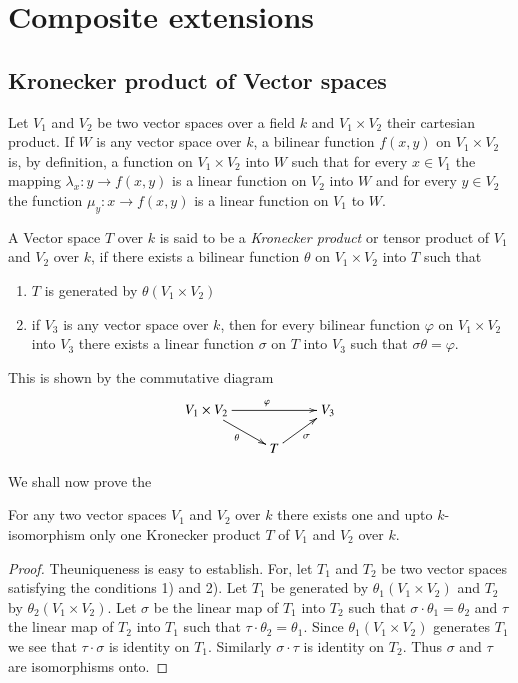 \chapter{Composite extensions}\label{chap5}%

\section{Kronecker product of Vector spaces}\label{c5:s1}\pageoriginale%

Let $V_1$ and $V_2$ be two vector spaces over a field $k$ and $V_1 \times
V_2$ their cartesian product. If $W$ is any vector space over $k$, a
bilinear function  $f(x,y)$ on $V_1 \times  V_2$ is, by definition, a
function on  $V_1 \times  V_2$  into $W$ such that for every $x \in V_1$ the
mapping $\lambda_x: y \to f(x,y)$ is a linear function on $V_2$ into
$W$ and for every $y \in V_2$ the function $\mu_y: x \to f(x,y)$ is a
linear function on $V_1$ to $W$. 

A Vector space $T$ over $k$ is said to be a \textit{Kronecker product}
or tensor product of $V_1$ and $V_2$ over $k$, if there exists a bilinear
function $\theta$ on  $V_1 \times  V_2$  into $T$ such that  
\begin{enumerate}[1)]
\item $T$ is generated by $\theta (V_1 \times  V_2)$ 

\item if $V_3$ is any vector space over $k$, then for every bilinear
  function $\varphi$ on  $V_1\times  V_2$  into $V_3$ there exists a
  linear function $\sigma$ on $T$ into $V_3$ such that $\sigma \theta =
  \varphi$. 
\end{enumerate}

This is shown by the commutative diagram
\[
\xymatrix@R=0.5cm{
V_1 \times V_2 \ar[rr]^{\varphi} \ar[dr]_{\theta} & & V_3\\
& T \ar[ur]_{\sigma}&
}
\]

We shall now prove the

\setcounter{thm}{0}
\begin{thm}\label{c5:thm1} %
For any two vector spaces $V_1$ and $V_2$ over $k$ there exists one
and upto $k$-isomorphism only one Kronecker product $T$ of $V_1$ and
$V_2$ over $k$. 
\end{thm}

\begin{proof}%
The\pageoriginale uniqueness is easy to establish. For, let $T_1$ and
$T_2$ be two 
vector spaces satisfying the  conditions 1) and 2). Let $T_1$ be
generated by $\theta_1(V_1 \times V_2)$ and $T_2$ by $\theta_2(V_1 \times
V_2)$. Let $\sigma$ be the linear map of $T_1$ into $T_2$ such that
$\sigma \cdot \theta_1 = \theta_2$ and $\tau$ the linear map of $T_2$ into
$T_1$ such that $\tau\cdot\theta_2 = \theta_1$. Since $\theta_1(V_1 \times
 V_2)$ generates $T_1$ we see that $\tau\cdot\sigma $ is identity on
$T_1$. Similarly $\sigma \cdot\tau$ is identity on $T_2$. Thus $\sigma$
and $\tau$ are isomorphisms onto. 
\end{proof}


